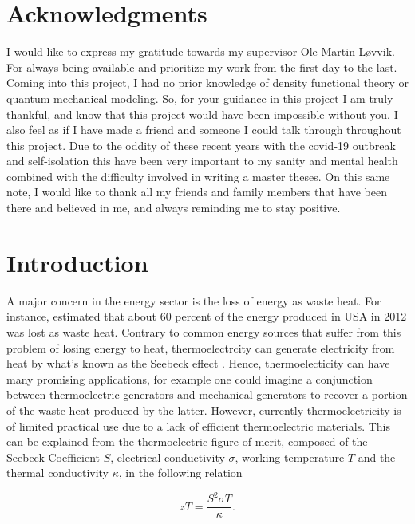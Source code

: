 \documentclass[UKenglish]{ifimaster}  %
\begin{document}
\chapter*{Acknowledgments}                    %
I would like to express my gratitude towards my supervisor Ole Martin Løvvik. For always being available and prioritize my work from the first day to the last. Coming into this project, I had no prior knowledge of density functional theory or quantum mechanical modeling. So, for your guidance in this project I am truly thankful, and know that this project would have been impossible without you. I also feel as if I have made a friend and someone I could talk through throughout this project. Due to the oddity of these recent years with the covid-19 outbreak and self-isolation this have been very important to my sanity and mental health combined with the difficulty involved in writing a master theses. On this same note, I would like to thank all my friends and family members that have been there and believed in me, and always reminding me to stay positive. 

\tableofcontents{}
\listoffigures{}
\listoftables{}

\mainmatter{}

\chapter{Introduction}                  %

A major concern in the energy sector is the loss of energy as waste heat. For instance, \cite{thermo} estimated that about 60 percent of the energy produced in USA in 2012 was lost as waste heat. Contrary to common energy sources that suffer from this problem of losing energy to heat, thermoelectrcity can generate electricity from heat by what's known as the Seebeck effect \cite{wikipedia_thermoelectric_2020}. Hence, thermoelecticity can have many promising applications, for example one could imagine a conjunction between thermoelectric generators and mechanical generators to recover a portion of the waste heat produced by the latter. However, currently thermoelectricity is of limited practical use due to a lack of efficient thermoelectric materials.  This can be explained from the thermoelectric figure of merit, composed of the Seebeck Coefficient $S$, electrical conductivity $\sigma$, working temperature $T$ and the thermal conductivity $\kappa$, in the following relation \cite{bandgap2Dirac} 

\begin{equation}
zT = \frac{S^2\sigma T}{\kappa}. 
\end{equation}
\end{document}
